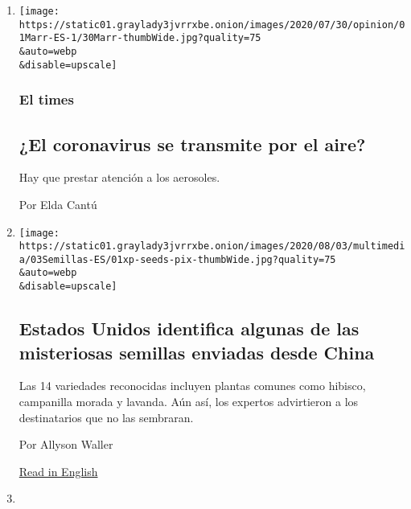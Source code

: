 \begin{enumerate}
\def\labelenumi{\arabic{enumi}.}
\item
  \href{/es/2020/08/04/espanol/coronavirus-bolsonaro-facebook.html}{}

  \texttt{[image: https://static01.graylady3jvrrxbe.onion/images/2020/07/30/opinion/01Marr-ES-1/30Marr-thumbWide.jpg?quality=75\\\&auto=webp\\\&disable=upscale]}

  \hypertarget{el-times}{%
  \subsubsection{El times}\label{el-times}}

  \hypertarget{el-coronavirus-se-transmite-por-el-aire}{%
  \subsection{¿El coronavirus se transmite por el
  aire?}\label{el-coronavirus-se-transmite-por-el-aire}}

  Hay que prestar atención a los aerosoles.

  Por Elda Cantú
\item
  \href{/es/2020/08/03/espanol/estados-unidos/semillas-correo-china.html}{}

  \texttt{[image: https://static01.graylady3jvrrxbe.onion/images/2020/08/03/multimedia/03Semillas-ES/01xp-seeds-pix-thumbWide.jpg?quality=75\\\&auto=webp\\\&disable=upscale]}

  \hypertarget{estados-unidos-identifica-algunas-de-las-misteriosas-semillas-enviadas-desde-china}{%
  \subsection{Estados Unidos identifica algunas de las misteriosas
  semillas enviadas desde
  China}\label{estados-unidos-identifica-algunas-de-las-misteriosas-semillas-enviadas-desde-china}}

  Las 14 variedades reconocidas incluyen plantas comunes como hibisco,
  campanilla morada y lavanda. Aún así, los expertos advirtieron a los
  destinatarios que no las sembraran.

  Por Allyson Waller

  \href{https://www.nytimes3xbfgragh.onion/2020/08/02/us/Seed-packets-China-USA.html}{Read
  in English}
\item
  \href{/es/2020/08/03/espanol/cultura/victor-victor-murio-coronavirus.html}{}


\end{enumerate}
